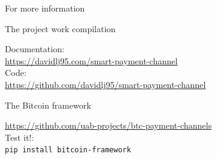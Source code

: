 \documentclass{beamer}
\begin{document}
\begin{frame}{For more information}
 \begin{block}{The project work compilation}
  \begin{center}
   Documentation:\\
   \url{https://davidlj95.com/smart-payment-channel}\\
   Code:\\
   \url{https://github.com/davidlj95/smart-payment-channel}
  \end{center}
 \end{block}
 \begin{block}{The Bitcoin framework}
  \begin{center}
   \url{https://github.com/uab-projects/btc-payment-channels}\\
   Test it!:\\
   \texttt{pip install bitcoin-framework}
  \end{center}
 \end{block}
\end{frame}
\end{document}
